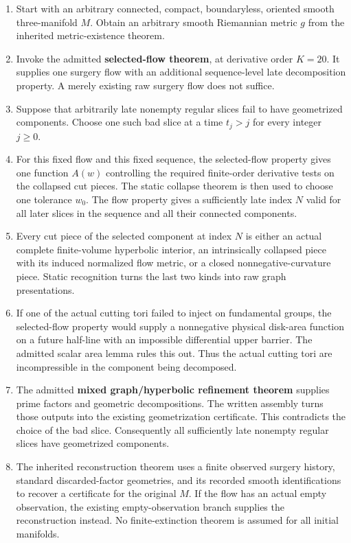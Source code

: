\documentclass[
  letterpaper,
  11pt]{article}
\providecommand{\tightlist}{%
  \setlength{\itemsep}{0pt}\setlength{\parskip}{0pt}}
\begin{document}
\begin{enumerate}
\def\labelenumi{\arabic{enumi}.}
\tightlist
\item
  Start with an arbitrary connected, compact, boundaryless, oriented
  smooth three-manifold \(M\). Obtain an arbitrary smooth Riemannian
  metric \(g\) from the inherited metric-existence theorem.
\item
  Invoke the admitted \textbf{selected-flow theorem}, at derivative
  order \(K=20\). It supplies one surgery flow with an additional
  sequence-level late decomposition property. A merely existing raw
  surgery flow does not suffice.
\item
  Suppose that arbitrarily late nonempty regular slices fail to have
  geometrized components. Choose one such bad slice at a time \(t_j>j\)
  for every integer \(j\geq0\).
\item
  For this fixed flow and this fixed sequence, the selected-flow
  property gives one function \(A(w)\) controlling the required
  finite-order derivative tests on the collapsed cut pieces. The static
  collapse theorem is then used to choose one tolerance \(w_0\). The
  flow property gives a sufficiently late index \(N\) valid for all
  later slices in the sequence and all their connected components.
\item
  Every cut piece of the selected component at index \(N\) is either an
  actual complete finite-volume hyperbolic interior, an intrinsically
  collapsed piece with its induced normalized flow metric, or a closed
  nonnegative-curvature piece. Static recognition turns the last two
  kinds into raw graph presentations.
\item
  If one of the actual cutting tori failed to inject on fundamental
  groups, the selected-flow property would supply a nonnegative physical
  disk-area function on a future half-line with an impossible
  differential upper barrier. The admitted scalar area lemma rules this
  out. Thus the actual cutting tori are incompressible in the component
  being decomposed.
\item
  The admitted \textbf{mixed graph/hyperbolic refinement theorem}
  supplies prime factors and geometric decompositions. The written
  assembly turns those outputs into the existing geometrization
  certificate. This contradicts the choice of the bad slice.
  Consequently all sufficiently late nonempty regular slices have
  geometrized components.
\item
  The inherited reconstruction theorem uses a finite observed surgery
  history, standard discarded-factor geometries, and its recorded smooth
  identifications to recover a certificate for the original \(M\). If
  the flow has an actual empty observation, the existing
  empty-observation branch supplies the reconstruction instead. No
  finite-extinction theorem is assumed for all initial manifolds.
\end{enumerate}
\end{document}
